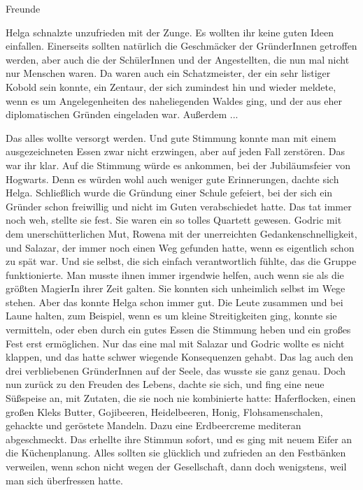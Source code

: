 \documentclass[fontsize=12pt]{scrartcl}
\begin{document}
	{\huge  Freunde}
	\vspace{15pt}
	
	{\LARGE H}elga schnalzte unzufrieden mit der Zunge. Es wollten ihr keine guten Ideen einfallen. Einerseits sollten natürlich die Geschmäcker der GründerInnen getroffen werden, aber auch die der SchülerInnen und der Angestellten, die nun mal nicht nur Menschen waren. Da waren auch ein Schatzmeister, der ein sehr listiger Kobold sein konnte, ein Zentaur, der sich zumindest hin und wieder meldete, wenn es um Angelegenheiten des naheliegenden Waldes ging, und der aus eher diplomatischen Gründen eingeladen war. Außerdem ...
	
	Das alles wollte versorgt werden. Und gute Stimmung konnte man mit einem ausgezeichneten Essen zwar nicht erzwingen, aber auf jeden Fall zerstören. Das war ihr klar. Auf die Stimmung würde es ankommen, bei der Jubiläumsfeier von Hogwarts. Denn es würden wohl auch weniger gute Erinnerungen, dachte sich Helga. Schließlich wurde die Gründung einer Schule gefeiert, bei der sich ein Gründer schon freiwillig und nicht im Guten verabschiedet hatte. 
	Das tat immer noch weh, stellte sie fest. Sie waren ein so tolles Quartett gewesen. Godric mit dem unerschütterlichen Mut, Rowena mit der unerreichten Gedankenschnelligkeit, und Salazar, der immer noch einen Weg gefunden hatte, wenn es eigentlich schon zu spät war. Und sie selbst, die sich einfach verantwortlich fühlte, das die Gruppe funktionierte. Man musste ihnen immer irgendwie helfen, auch wenn sie als die größten MagierIn ihrer Zeit galten. Sie konnten sich unheimlich selbst im Wege stehen. Aber das konnte Helga schon immer gut. Die Leute zusammen und bei Laune halten, zum Beispiel, wenn es um kleine Streitigkeiten ging, konnte sie vermitteln, oder eben durch ein gutes Essen die Stimmung heben und ein großes Fest erst ermöglichen. 
	Nur das eine mal mit Salazar und Godric wollte es nicht klappen, und das hatte schwer wiegende Konsequenzen gehabt. Das lag auch den drei verbliebenen GründerInnen auf der Seele, das wusste sie ganz genau. 
	Doch nun zurück zu den Freuden des Lebens, dachte sie sich, und fing eine neue Süßspeise an, mit Zutaten, die sie noch nie kombinierte hatte: Haferflocken, einen großen Kleks Butter, Gojibeeren, Heidelbeeren, Honig, Flohsamenschalen, gehackte und geröstete Mandeln. Dazu eine Erdbeercreme mediteran abgeschmeckt. 
	Das erhellte ihre Stimmun sofort, und es ging mit neuem Eifer an die Küchenplanung. Alles sollten sie glücklich und zufrieden an den Festbänken verweilen, wenn schon nicht wegen der Gesellschaft, dann doch wenigstens, weil man sich überfressen hatte.
	
	
\end{document}
